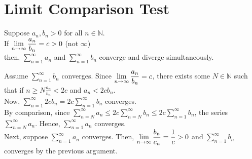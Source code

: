 \documentclass[12pt]{article}
\begin{document}
\section{Limit Comparison Test}
\begin{theo}{}
Suppose \(a_n, b_n > 0\) for all \(n \in \mathbb N\).\\
If \(\displaystyle\lim_{n\to\infty}\frac{a_n}{b_n} = c > 0\) (not \(\infty\))\\
then, \(\displaystyle\sum_{n=1}^\infty a_n\) and \(\displaystyle\sum_{n=1}^\infty b_n\) converge and diverge simultaneously.    
\end{theo}
\begin{prf}{}
Assume \(\displaystyle\sum_{n=1}^\infty b_n\) converges. Since \(\displaystyle\lim_{n\to\infty}\frac{a_n}{b_n} = c\), there exists some \(N \in \mathbb N\) such that if \(n \ge N\)\(\frac{a_n}{b_n} < 2c\) and \(a_n < 2cb_n\).\\
Now, \(\displaystyle\sum_{n=1}^\infty 2cb_n = 2c\displaystyle\sum_{n=1}^\infty b_n\) converges.\\
By comparison, since \(\displaystyle\sum_{n=N}^\infty a_n \le 2c\displaystyle\sum_{n=N}^\infty b_n \le 2c\displaystyle\sum_{n=1}^\infty b_n\), the series \(\displaystyle\sum_{n=N}^\infty a_n\). Hence, \(\displaystyle\sum_{n=1}^\infty a_n\) converges.\\
Next, suppose \(\displaystyle\sum_{n=1}^\infty a_n\) converges. Then, \(\displaystyle\lim_{n\to\infty}\frac{b_n}{c_n} = \frac{1}{c} > 0\) and \(\displaystyle\sum_{n=1}^\infty b_n\) converges by the previous argument.
\end{prf}
\end{document}
